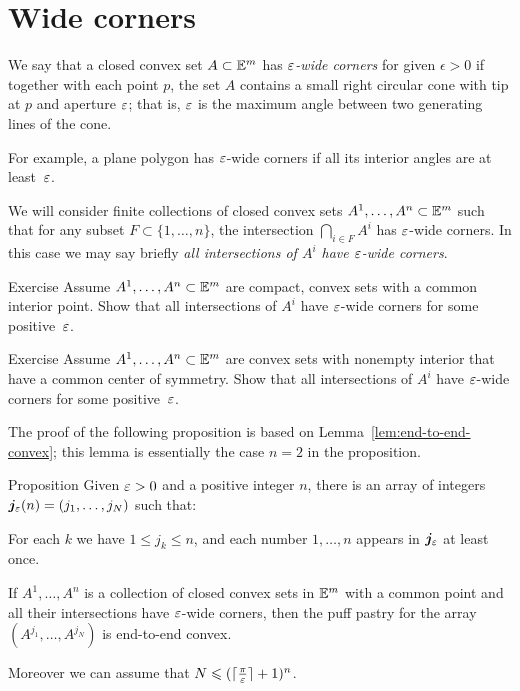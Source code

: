 \section{Wide corners}

We say that a closed convex set $A\subset \mathbb{E}^m$ has  \emph{$\varepsilon$-wide corners}\label{page:wide corners} for given $\epsilon >0$ 
if together with each point $p$, 
the set $A$ contains a small right circular cone
with tip at $p$ and aperture $\varepsilon$;
that is, $\varepsilon$ is the maximum angle between two generating lines of the cone.

For example, 
a plane polygon 
has $\varepsilon$-wide corners
if all its interior angles are at least~$\varepsilon$.

We will consider finite collections of closed convex sets 
$A^1,\dots,A^n\z\subset\EE^m$ 
such that for any subset $F\subset\{1,\dots,n\}$,
the intersection
$\bigcap_{i\in F}A^i$ 
has $\varepsilon$-wide corners.
In this case we may say briefly \emph{all intersections of $A^i$ have $\varepsilon$-wide corners}.


\begin{thm}{Exercise}\label{ex:compact-walls}
Assume $A^1,\dots,A^n\subset\mathbb{E}^m$ are compact, convex sets with a common interior point.
Show that all intersections of $A^i$ have $\varepsilon$-wide corners for some positive~$\varepsilon$.
\end{thm}

\begin{thm}{Exercise}\label{ex:centrally-simmetric-walls}
Assume $A^1,\dots,A^n\subset\mathbb{E}^m$ are
convex sets with nonempty interior that have a common center of symmetry.
Show that all intersections of $A^i$ have $\varepsilon$-wide corners for some positive~$\varepsilon$.
\end{thm}

The proof of the following proposition is based on Lemma~\ref{lem:end-to-end-convex};
this lemma is essentially the case $n=2$ in the proposition.

\begin{thm}{Proposition}\label{prop:end-to-end-convex}
Given $\varepsilon>0$ and a positive integer $n$, 
there is an array of integers $\bm{j}_\varepsilon(n)=(j_1,\dots,j_N)$ 
such that: 

\begin{subthm}{} For each $k$ we have $1\le j_k\le n$,
and each number $1,\dots,n$ appears in $\bm{j}_\varepsilon$ at least once.
\end{subthm}

\begin{subthm}{}
If $A^1,\dots,A^n$ is a collection of closed convex sets in $\mathbb{E}^m$ with a common point 
and all their intersections have $\varepsilon$-wide corners,  
then the puff pastry for the array
$(A^{j_1},\dots,A^{j_N})$ is end-to-end convex.
\end{subthm}

Moreover we can assume that $N\leqslant (\lceil\tfrac\pi{\varepsilon}\rceil+1)^n$.
\end{thm}

